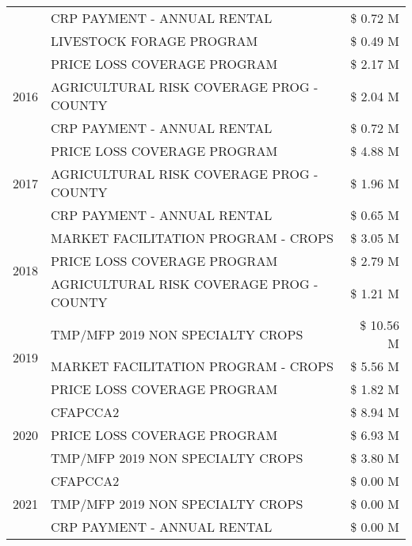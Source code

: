 \begin{tabular}{llr}
 & CRP PAYMENT - ANNUAL RENTAL & \$ 0.72 M \\
 & LIVESTOCK FORAGE PROGRAM & \$ 0.49 M \\
\cline{1-3}
\multirow[t]{3}{*}{2016} & PRICE LOSS COVERAGE PROGRAM & \$ 2.17 M \\
 & AGRICULTURAL RISK COVERAGE PROG - COUNTY & \$ 2.04 M \\
 & CRP PAYMENT - ANNUAL RENTAL & \$ 0.72 M \\
\cline{1-3}
\multirow[t]{3}{*}{2017} & PRICE LOSS COVERAGE PROGRAM & \$ 4.88 M \\
 & AGRICULTURAL RISK COVERAGE PROG - COUNTY & \$ 1.96 M \\
 & CRP PAYMENT - ANNUAL RENTAL & \$ 0.65 M \\
\cline{1-3}
\multirow[t]{3}{*}{2018} & MARKET FACILITATION PROGRAM - CROPS & \$ 3.05 M \\
 & PRICE LOSS COVERAGE PROGRAM & \$ 2.79 M \\
 & AGRICULTURAL RISK COVERAGE PROG - COUNTY & \$ 1.21 M \\
\cline{1-3}
\multirow[t]{3}{*}{2019} & TMP/MFP 2019 NON SPECIALTY CROPS & \$ 10.56 M \\
 & MARKET FACILITATION PROGRAM - CROPS & \$ 5.56 M \\
 & PRICE LOSS COVERAGE PROGRAM & \$ 1.82 M \\
\cline{1-3}
\multirow[t]{3}{*}{2020} & CFAPCCA2 & \$ 8.94 M \\
 & PRICE LOSS COVERAGE PROGRAM & \$ 6.93 M \\
 & TMP/MFP 2019 NON SPECIALTY CROPS & \$ 3.80 M \\
\cline{1-3}
\multirow[t]{3}{*}{2021} & CFAPCCA2 & \$ 0.00 M \\
 & TMP/MFP 2019 NON SPECIALTY CROPS & \$ 0.00 M \\
 & CRP PAYMENT - ANNUAL RENTAL & \$ 0.00 M \\
\cline{1-3}
\bottomrule
\end{tabular}
